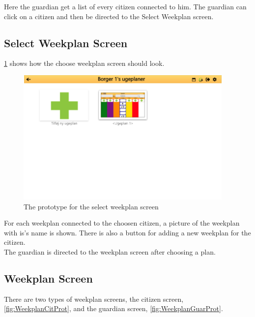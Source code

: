 Here the guardian get a list of every citizen connected to him. The guardian can click on a citizen and then be directed to the Select Weekplan screen. 

\subsection*{Select Weekplan Screen}

\ref{fig:ChooseWeekProt} shows how the choose weekplan screen should look.
\begin{figure}[H]
    \begin{center}
        \includegraphics[width=0.95\textwidth]{figures/Prototypes/SelectWeekplanPrototype.png}
    \end{center}
    \caption{The prototype for the select weekplan screen}
    \label{fig:ChooseWeekProt}
\end{figure}

For each weekplan connected to the choosen citizen, a picture of the weekplan with is's name is shown. There is also a button for adding a new weekplan for the citizen.\\
The guardian is directed to the weekplan screen after choosing a plan.\\

\subsection*{Weekplan Screen}
There are two types of weekplan screens, the citizen screen, \ref{fig:WeekplanCitProt}, and the guardian screen, \ref{fig:WeekplanGuarProt}. 

